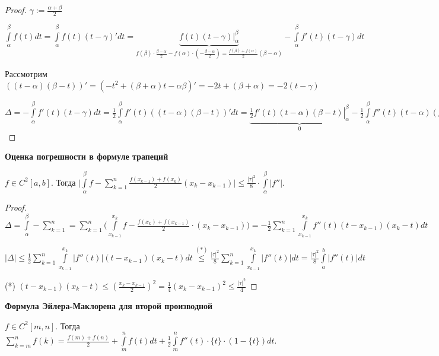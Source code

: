\begin{proof}
    $\gamma := \frac{\alpha + \beta}{2}$ 
    
    $\int\limits_\alpha^\beta f(t)dt=\int\limits_\alpha^\beta f(t)(t-\gamma)'dt=\underbrace{\left. f(t)(t-\gamma)\right|^\beta_\alpha}_{f(\beta)\cdot\frac{\beta-\alpha}{2}-f(\alpha)\cdot(-\frac{\beta-\alpha}{2})=\frac{f(\beta)+f(\alpha)}{2}(\beta-\alpha)} -\int\limits_\alpha^\beta f'(t)(t-\gamma)dt$

    Рассмотрим $((t-\alpha)(\beta-t))'=(-t^2+(\beta+\alpha)t-\alpha\beta)'=-2t+(\beta+\alpha)=-2(t-\gamma)$

    $\Delta=-\int\limits_\alpha^\beta f'(t)(t-\gamma)dt
    =\frac{1}{2}\int\limits_\alpha^\beta f'(t)((t-\alpha)(\beta-t))'dt
    =\underbrace{\left.\frac{1}{2}f'(t)(t-\alpha)(\beta-t)\right|^\beta_\alpha}_{0}-\frac{1}{2}\int\limits_\alpha^\beta f''(t)(t-\alpha)(\beta-t)dt$
\end{proof}

\begin{theorem}
    \textbf{Оценка погрешности в формуле трапеций}

    $f\in C^2[a, b]$. Тогда $\bigg|\int\limits_\alpha^\beta f-\sum\limits_{k=1}^n\frac{f(x_{k-1})+f(x_k)}{2}(x_k-x_{k-1})\bigg|\leq \frac{|\tau|^2}{8}\cdot \int\limits_\alpha^\beta|f''|$.
\end{theorem}

\begin{proof}
    $\Delta =\int\limits_\alpha^\beta -\sum\limits_{k=1}^n
    =\sum\limits_{k=1}^n\bigg(\int\limits_{x_{k-1}}^{x_k} f - \frac{f(x_k)+f(x_{k-1})}{2}\cdot(x_k-x_{k-1})\bigg)
    =-\frac{1}{2}\sum\limits_{k=1}^n \int\limits_{x_{k-1}}^{x_k} f'' (t)(t-x_{k-1})(x_k-t)dt$

    $|\Delta|\leq \frac{1}{2}\sum\limits_{k=1}^n \int\limits_{x_{k-1}}^{x_k} |f'' (t)|(t-x_{k-1})(x_k-t)dt\overset{(*)}{\leq} \frac{|\tau|^2}{8}\sum\limits_{k=1}^n\int\limits_{x_{k-1}}^{x_k} |f''(t)|dt=\frac{|\tau|^2}{8}\int\limits_{a}^{b} |f''(t)|dt$

    (*) $(t-x_{k-1})(x_k-t)\leq (\frac{x_k-x_{k-1}}{2})^2=\frac{1}{4}(x_k-x_{k-1})^2\leq \frac{|\tau|^2}{4}$
\end{proof}

\begin{theorem}
    \textbf{Формула Эйлера-Маклорена для второй производной}

    $f\in C^2[m, n]$. Тогда $\sum\limits_{k=m}^n f(k)=\frac{f(m)+f(n)}{2}+\int\limits_m^n f(t)dt+\frac{1}{2}\int\limits_m^nf''(t)\cdot \{t\}\cdot(1-\{t\})dt$.
\end{theorem}

